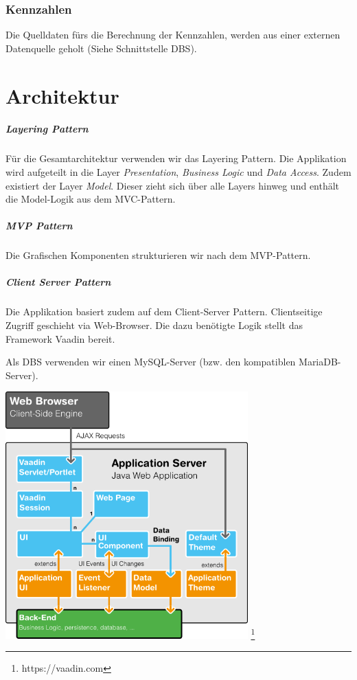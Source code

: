 \documentclass[a4paper]{scrreprt}
\begin{document}
\subsection{Kennzahlen}
Die Quelldaten fürs die Berechnung der Kennzahlen, werden aus einer externen Datenquelle geholt (Siehe Schnittstelle DBS).






\chapter{Architektur}
\paragraph{Layering Pattern}
Für die Gesamtarchitektur verwenden wir das Layering Pattern. Die Applikation wird aufgeteilt in die Layer \textit{Presentation}, \textit{Business Logic} und \textit{Data Access}. Zudem existiert der Layer \textit{Model}. Dieser zieht sich über alle Layers hinweg und enthält die Model-Logik aus dem MVC-Pattern.


\paragraph{MVP Pattern}
Die Grafischen Komponenten strukturieren wir nach dem MVP-Pattern. 


\paragraph{Client Server Pattern}
Die Applikation basiert zudem auf dem Client-Server Pattern. Clientseitige Zugriff geschieht via Web-Browser. Die dazu benötigte Logik stellt das Framework Vaadin bereit.

\bigskip
Als DBS verwenden wir einen MySQL-Server (bzw. den kompatiblen MariaDB-Server).


\includegraphics[width=0.7\textwidth]{img/vaadin-arch.png} \footnote{https://vaadin.com}
\end{document}
